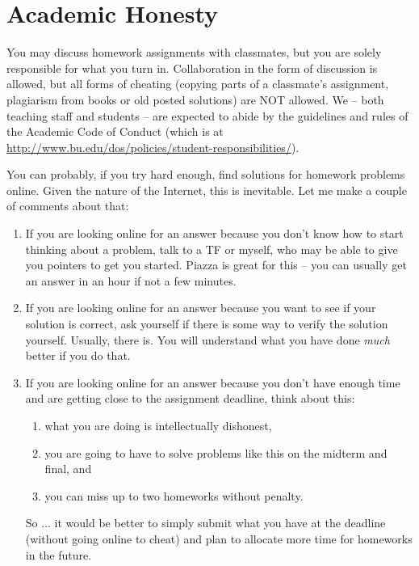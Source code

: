 \documentclass[11pt]{article}
\begin{document}
\newpage

\section*{Academic Honesty}

You may discuss homework assignments with classmates, but you are 
solely responsible for what you turn in. Collaboration in the form of
discussion is allowed, but all forms of cheating (copying parts of a
classmate's assignment, plagiarism from books or old posted solutions)
are NOT allowed. We -- both teaching staff and students -- are expected
to abide by the guidelines and rules of the Academic Code of Conduct
(which is at
\url{http://www.bu.edu/dos/policies/student-responsibilities/}).

You can probably, if you try hard enough, find solutions for homework
problems online.    Given the nature of the Internet, this is
inevitable.   Let me make a couple of comments about that:
\begin{enumerate}
\item If you are looking online for an answer because you don't know how
  to start thinking about a problem, talk to a TF or myself, who may be
  able to give you pointers to get you started.  Piazza is great for
  this -- you can usually get an answer in an hour if not a few minutes.
\item If you are looking online for an answer because you want to see if
  your solution is correct, ask yourself if there is some way to verify
  the solution yourself.   Usually, there is.  You will understand what you have done
  \emph{much} better if you do that.
\item If you are looking online for an answer because you don't have
  enough time and are getting close to the assignment deadline, think about this:
  \begin{enumerate}
  \item what you are doing is intellectually dishonest,
  \item you are going to have to solve problems like this on the midterm
    and final, and
  \item you can miss up to two homeworks without penalty.
  \end{enumerate}
So ... it would be better to simply submit what you have at the deadline
(without going online to cheat) and plan to allocate more time for
homeworks in the future.
\end{enumerate}

\newpage
\end{document}

